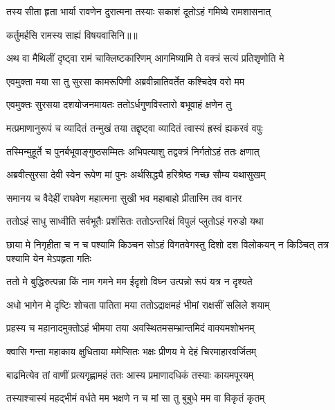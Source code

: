 \twolineshloka
{तस्य सीता हृता भार्या रावणेन दुरात्मना}
{तस्याः सकाशं दूतोऽहं गमिष्ये रामशासनात्} %

{कर्तुमर्हसि रामस्य साह्यं विषयवासिनि॥॥} %

\addtocounter{shlokacount}{1}

\twolineshloka
{अथ वा मैथिलीं दृष्ट्वा रामं चाक्लिष्टकारिणम्}
{आगमिष्यामि ते वक्त्रं सत्यं प्रतिशृणोति मे} %

\twolineshloka
{एवमुक्ता मया सा तु सुरसा कामरूपिणी}
{अब्रवीन्नातिवर्तेत कश्चिदेष वरो मम} %

\twolineshloka
{एवमुक्तः सुरसया दशयोजनमायतः}
{ततोऽर्धगुणविस्तारो बभूवाहं क्षणेन तु} %

\twolineshloka
{मत्प्रमाणानुरूपं च व्यादितं तन्मुखं तया}
{तद्दृष्ट्वा व्यादितं त्वास्यं ह्रस्वं ह्यकरवं वपुः} %

\twolineshloka
{तस्मिन्मुहूर्ते च पुनर्बभूवाङ्गुष्ठसम्मितः}
{अभिपत्याशु तद्वक्त्रं निर्गतोऽहं ततः क्षणात्} %

\twolineshloka
{अब्रवीत्सुरसा देवी स्वेन रूपेण मां पुनः}
{अर्थसिद्ध्यै हरिश्रेष्ठ गच्छ सौम्य यथासुखम्} %

\twolineshloka
{समानय च वैदेहीं राघवेण महात्मना}
{सुखी भव महाबाहो प्रीतास्मि तव वानर} %

\twolineshloka
{ततोऽहं साधु साध्वीति सर्वभूतैः प्रशंसितः}
{ततोऽन्तरिक्षं विपुलं प्लुतोऽहं गरुडो यथा} %

\threelineshloka
{छाया मे निगृहीता च न च पश्यामि किञ्चन}
{सोऽहं विगतवेगस्तु दिशो दश विलोकयन्}
{न किञ्चित् तत्र पश्यामि येन मेऽपहृता गतिः} %

\twolineshloka
{ततो मे बुद्धिरुत्पन्ना किं नाम गमने मम}
{ईदृशो विघ्न उत्पन्नो रूपं यत्र न दृश्यते} %

\twolineshloka
{अधो भागेन मे दृष्टिः शोचता पातिता मया}
{ततोऽद्राक्षमहं भीमां राक्षसीं सलिले शयाम्} %

\twolineshloka
{प्रहस्य च महानादमुक्तोऽहं भीमया तया}
{अवस्थितमसम्भ्रान्तमिदं वाक्यमशोभनम्} %

\twolineshloka
{क्वासि गन्ता महाकाय क्षुधिताया ममेप्सितः}
{भक्षः प्रीणय मे देहं चिरमाहारवर्जितम्} %

\twolineshloka
{बाढमित्येव तां वाणीं प्रत्यगृह्णामहं ततः}
{आस्य प्रमाणादधिकं तस्याः कायमपूरयम्} %

\twolineshloka
{तस्याश्चास्यं महद्भीमं वर्धते मम भक्षणे}
{न च मां सा तु बुबुधे मम वा विकृतं कृतम्} %

